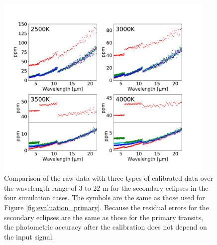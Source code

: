 \documentclass{aastex62}
\begin{document}
\begin{figure}[H]
\begin{center}
\includegraphics[width=10.5cm]{systematic_evaluation_secondary.pdf}
\caption{Comparison of the raw data with three types of calibrated data over the wavelength range of 3 to 22 \textmu m for the secondary eclipses in the four simulation cases. The symbols are the same as those used for Figure \ref{fig:evaluation_primary}. Because the residual errors for the secondary eclipses are the same as those for the primary transits, the photometric accuracy after the calibration does not depend on the input signal. \label{fig:evaluation_secondary}}
\end{center}
\end{figure}
\end{document}
